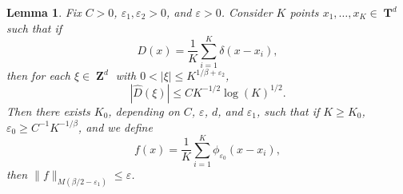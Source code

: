 \documentclass[12pt,reqno]{article}
\numberwithin{equation}{section}
\DeclareMathOperator{\ZZ}{\mathbf{Z}}
\DeclareMathOperator{\TT}{\mathbf{T}}
\newtheorem{lemma}{Lemma}
\begin{document}
\begin{lemma} \label{Lemma65493}
    Fix $C > 0$, $\varepsilon_1, \varepsilon_2 > 0$, and $\varepsilon > 0$. Consider $K$ points $x_1, \dots, x_K \in \TT^d$ such that if
    \[ D(x) = \frac{1}{K} \sum_{i = 1}^K \delta(x - x_i), \]
    then for each $\xi \in \ZZ^d$ with $0 < |\xi| \leq K^{1/\beta + \varepsilon_2}$,
    \begin{equation} \label{equationFFOSOXPFFGHI}
        |\widehat{D}(\xi)| \leq C K^{-1/2} \log(K)^{1/2}.
    \end{equation}
    Then there exists $K_0$, depending on $C$, $\varepsilon$, $d$, and $\varepsilon_1$, such that if $K \geq K_0$, $\varepsilon_0 \geq C^{-1} K^{-1/\beta}$, and we define
    \[ f(x) = \frac{1}{K} \sum_{i = 1}^K \phi_{\varepsilon_0}(x - x_i), \]
    then $\| f \|_{M(\beta/2 - \varepsilon_1)} \leq \varepsilon$.
\end{lemma}
\end{document}
